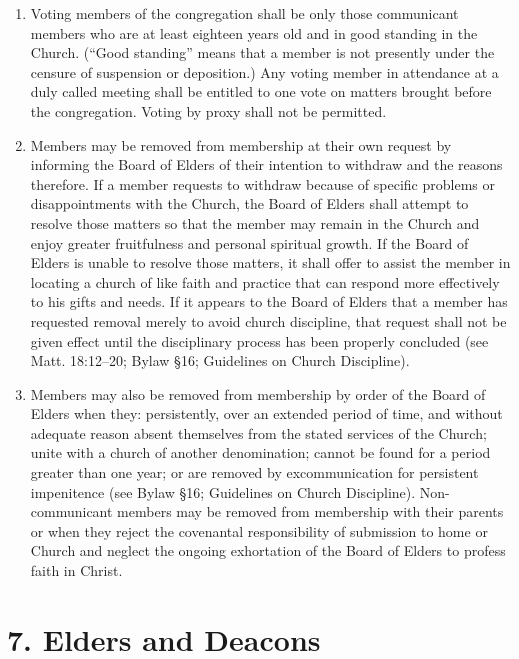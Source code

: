 \documentclass[
]{book}
\begin{document}
\begin{enumerate}
\item
  Voting members of the congregation shall be only those communicant members who are at least eighteen years old and in good standing in the Church. (``Good standing'' means that a member is not presently under the censure of suspension or deposition.) Any voting member in attendance at a duly called meeting shall be entitled to one vote on matters brought before the congregation. Voting by proxy shall not be permitted.
\item
  Members may be removed from membership at their own request by informing the Board of Elders of their intention to withdraw and the reasons therefore. If a member requests to withdraw because of specific problems or disappointments with the Church, the Board of Elders shall attempt to resolve those matters so that the member may remain in the Church and enjoy greater fruitfulness and personal spiritual growth. If the Board of Elders is unable to resolve those matters, it shall offer to assist the member in locating a church of like faith and practice that can respond more effectively to his gifts and needs. If it appears to the Board of Elders that a member has requested removal merely to avoid church discipline, that request shall not be given effect until the disciplinary process has been properly concluded (see Matt. 18:12--20; Bylaw §16; Guidelines on Church Discipline).
\item
  Members may also be removed from member­ship by order of the Board of Elders when they: persis­tently, over an extended period of time, and without adequate reason absent themselves from the stated services of the Church; unite with a church of another denomination; cannot be found for a period greater than one year; or are removed by excommunication for persistent impenitence (see Bylaw §16; Guidelines on Church Discipline). Non-communicant members may be removed from membership with their parents or when they reject the covenantal responsibility of submission to home or Church and neglect the ongoing exhort­a­tion of the Board of Elders to profess faith in Christ.
\end{enumerate}

\hypertarget{elders-and-deacons}{%
\section*{7. Elders and Deacons}\label{elders-and-deacons}}
\end{document}
